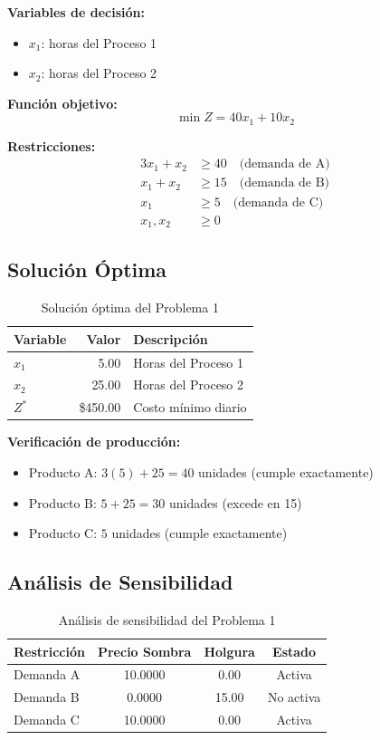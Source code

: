 \documentclass[12pt,a4paper]{article}
\begin{document}
\textbf{Variables de decisión:}
\begin{itemize}[nosep]
    \item $x_1$: horas del Proceso 1
    \item $x_2$: horas del Proceso 2
\end{itemize}

\textbf{Función objetivo:}
\[
\min Z = 40x_1 + 10x_2
\]

\textbf{Restricciones:}
\begin{align}
3x_1 + x_2 &\geq 40 \quad \text{(demanda de A)} \\
x_1 + x_2 &\geq 15 \quad \text{(demanda de B)} \\
x_1 &\geq 5 \quad \text{(demanda de C)} \\
x_1, x_2 &\geq 0
\end{align}

\subsection{Solución Óptima}

\begin{table}[h]
\centering
\begin{tabular}{lrl}
\toprule
\textbf{Variable} & \textbf{Valor} & \textbf{Descripción} \\
\midrule
$x_1$ & 5.00 & Horas del Proceso 1 \\
$x_2$ & 25.00 & Horas del Proceso 2 \\
$Z^*$ & \$450.00 & Costo mínimo diario \\
\bottomrule
\end{tabular}
\caption{Solución óptima del Problema 1}
\end{table}

\textbf{Verificación de producción:}
\begin{itemize}[nosep]
    \item Producto A: $3(5) + 25 = 40$ unidades (cumple exactamente)
    \item Producto B: $5 + 25 = 30$ unidades (excede en 15)
    \item Producto C: $5$ unidades (cumple exactamente)
\end{itemize}

\subsection{Análisis de Sensibilidad}

\begin{table}[h]
\centering
\begin{tabular}{lccc}
\toprule
\textbf{Restricción} & \textbf{Precio Sombra} & \textbf{Holgura} & \textbf{Estado} \\
\midrule
Demanda A & 10.0000 & 0.00 & Activa \\
Demanda B & 0.0000 & 15.00 & No activa \\
Demanda C & 10.0000 & 0.00 & Activa \\
\bottomrule
\end{tabular}
\caption{Análisis de sensibilidad del Problema 1}
\end{table}
\end{document}
